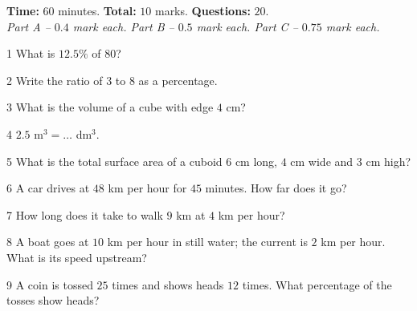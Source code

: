 \begin{knowbox}
\textbf{Time:} $60$ minutes. \quad \textbf{Total:} $10$ marks. \quad \textbf{Questions:} $20$.\\[2pt]\emph{Part A -- $0.4$ mark each. \quad Part B -- $0.5$ mark each. \quad Part C -- $0.75$ mark each.}
\end{knowbox}
\gap
{}
\begin{probbox}{1}{\relax}
What is $12.5\%$ of $80$?
\end{probbox}
\gap
\begin{probbox}{2}{\relax}
Write the ratio of $3$ to $8$ as a percentage.
\end{probbox}
\gap
\begin{probbox}{3}{\relax}
What is the volume of a cube with edge $4$ cm?
\end{probbox}
\gap
\begin{probbox}{4}{\relax}
$2.5$ m$^3=\ldots$ dm$^3$.
\end{probbox}
\gap
\begin{probbox}{5}{\relax}
What is the total surface area of a cuboid $6$ cm long, $4$ cm wide and $3$ cm high?
\end{probbox}
\gap
\begin{probbox}{6}{\relax}
A car drives at $48$ km per hour for $45$ minutes. How far does it go?
\end{probbox}
\gap
\begin{probbox}{7}{\relax}
How long does it take to walk $9$ km at $4$ km per hour?
\end{probbox}
\gap
\begin{probbox}{8}{\relax}
A boat goes at $10$ km per hour in still water; the current is $2$ km per hour. What is its speed upstream?
\end{probbox}
\gap
\begin{probbox}{9}{\relax}
A coin is tossed $25$ times and shows heads $12$ times. What percentage of the tosses show heads?
\end{probbox}
